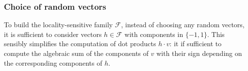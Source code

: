 \subsubsection{Choice of random vectors}
To build the locality-sensitive family $\mathcal{F}$, instead of choosing any random vectors, it is sufficient to consider vectors $h\in \mathcal{F}$ with components in $\{-1,1\}$. This sensibly simplifies the computation of dot products $h\cdot v$: it if sufficient to compute the algebraic sum of the components of $v$ with their sign depending on the corresponding components of $h$.
% 
